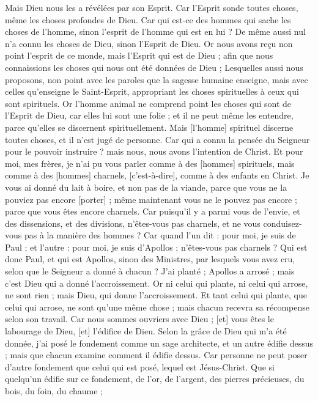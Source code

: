 \begin{multicols}{2}
Mais Dieu nous les a révélées par son Esprit. Car l'Esprit sonde toutes choses, même les choses profondes de Dieu.
Car qui est-ce des hommes qui sache les choses de l'homme, sinon l’esprit de l'homme qui est en lui ? De même aussi nul n'a connu les choses de Dieu, sinon l'Esprit de Dieu.
Or nous avons reçu non point l'esprit de ce monde, mais l'Esprit qui est de Dieu ; afin que nous connaissions les choses qui nous ont été données de Dieu ;
Lesquelles aussi nous proposons, non point avec les paroles que la sagesse humaine enseigne, mais avec celles qu'enseigne le Saint-Esprit, appropriant les choses spirituelles à ceux qui sont spirituels.
Or l'homme animal ne comprend point les choses qui sont de l'Esprit de Dieu, car elles lui sont une folie ; et il ne peut même les entendre, parce qu'elles se discernent spirituellement.
Mais [l'homme] spirituel discerne toutes choses, et il n'est jugé de personne.
Car qui a connu la pensée du Seigneur pour le pouvoir instruire ? mais nous, nous avons l'intention de Christ.
\VerseOne{}Et pour moi, mes frères, je n'ai pu vous parler comme à des [hommes] spirituels, mais comme à des [hommes] charnels, [c'est-à-dire], comme à des enfants en Christ.
Je vous ai donné du lait à boire, et non pas de la viande, parce que vous ne la pouviez pas encore [porter] ; même maintenant vous ne le pouvez pas encore ; parce que vous êtes encore charnels.
Car puisqu'il y a parmi vous de l'envie, et des dissensions, et des divisions, n'êtes-vous pas charnels, et ne vous conduisez-vous pas à la manière des hommes ?
Car quand l'un dit : pour moi, je suis de Paul ; et l'autre : pour moi, je suis d'Apollos ; n'êtes-vous pas charnels ?
Qui est donc Paul, et qui est Apollos, sinon des Ministres, par lesquels vous avez cru, selon que le Seigneur a donné à chacun ?
J'ai planté ; Apollos a arrosé ; mais c'est Dieu qui a donné l'accroissement.
Or ni celui qui plante, ni celui qui arrose, ne sont rien ; mais Dieu, qui donne l'accroissement.
Et tant celui qui plante, que celui qui arrose, ne sont qu'une même chose ; mais chacun recevra sa récompense selon son travail.
Car nous sommes ouvriers avec Dieu ; [et] vous êtes le labourage de Dieu, [et] l'édifice de Dieu.
Selon la grâce de Dieu qui m'a été donnée, j'ai posé le fondement comme un sage architecte, et un autre édifie dessus ; mais que chacun examine comment il édifie dessus.
Car personne ne peut poser d'autre fondement que celui qui est posé, lequel est Jésus-Christ.
Que si quelqu'un édifie sur ce fondement, de l'or, de l'argent, des pierres précieuses, du bois, du foin, du chaume ;

\end{multicols}
